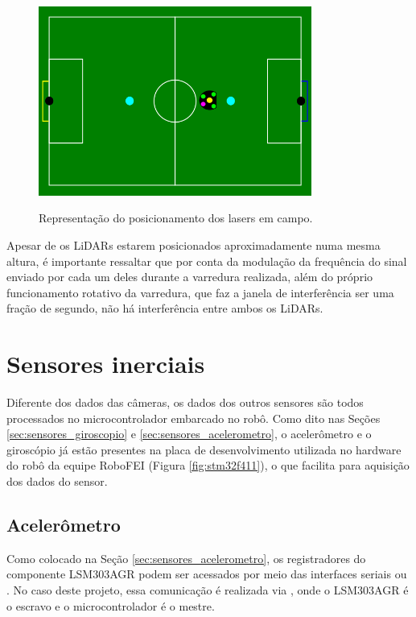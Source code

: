 \documentclass[acronym, symbols, table]{fei}
\begin{document}
	\begin{figure}[!htb]
		\centering
		\caption{Representação do posicionamento dos lasers em campo.}
		\includegraphics[width=0.80\textwidth]{representacao_teste_lidar_cameras.png}
		\label{fig:representacao_teste_lidar}
	\end{figure}

	Apesar de os LiDARs estarem posicionados aproximadamente numa mesma altura, é importante ressaltar que por conta da modulação da frequência do sinal enviado por cada um deles durante a varredura realizada, além do próprio funcionamento rotativo da varredura, que faz a janela de interferência ser uma fração de segundo, não há interferência entre ambos os LiDARs.
	
	\section{Sensores inerciais}
	
	Diferente dos dados das câmeras, os dados dos outros sensores são todos processados no microcontrolador embarcado no robô. Como dito nas Seções \ref{sec:sensores_giroscopio} e \ref{sec:sensores_acelerometro}, o acelerômetro e o giroscópio já estão presentes na placa de desenvolvimento utilizada no hardware do robô da equipe RoboFEI (Figura \ref{fig:stm32f411}), o que facilita para aquisição dos dados do sensor.
	
	\subsection{Acelerômetro}
	
	Como colocado na Seção \ref{sec:sensores_acelerometro}, os registradores do componente LSM303AGR podem ser acessados por meio das interfaces seriais  ou . No caso deste projeto, essa comunicação é realizada via , onde o LSM303AGR é o escravo e o microcontrolador é o mestre.
	
\end{document}
